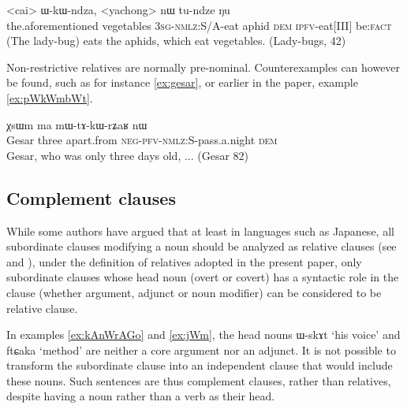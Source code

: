 \documentclass[oldfontcommands,oneside,a4paper,11pt]{article}
\newcommand{\ipa}[1]{{\phon #1}} %
\newcommand{\topic}{\textsc{dem}}
\begin{document}
\begin{exe}
   \ex  \label{ex:yachong}
\gll \ipa{iɕqʰa}  	<cai>  	\ipa{ɯ-kɯ-ndza},  	<yachong>  	\ipa{nɯ}  	\ipa{tu-ndze}  	\ipa{ŋu}  \\
the.aforementioned vegetables \textsc{3sg-nmlz:}S/A-eat aphid \topic{} \textsc{ipfv}-eat[III] be:\textsc{fact} \\
\glt (The lady-bug) eats the aphids, which eat vegetables. (Lady-bugs, 42)
\end{exe}



Non-restrictive relatives are normally pre-nominal. Counterexamples can however be found, such as  for instance \ref{ex:gesar}, or earlier in the paper, example \ref{ex:pWkWmbWt}.

\begin{exe}
   \ex  \label{ex:gesar}
\gll  \ipa{ʁlaŋsaŋtɕʰin}  	\ipa{χsɯm}  	\ipa{ma}  	\ipa{mɯ-tɤ-kɯ-rʑaʁ}  	\ipa{nɯ}     	\\
  Gesar three apart.from \textsc{neg-pfv-nmlz:S}-pass.a.night \topic{}   \\
 \glt  Gesar, who was only three days old, ... (Gesar 82)
   \end{exe} 



%




\subsection{Complement clauses} \label{sec:non.relative}
While some authors have argued that at least in languages such as Japanese, all subordinate clauses modifying a noun should be analyzed as relative clauses (see \citet{matsumoto88adnominal} and \citet{comrie98relatives.rethinking}), under the definition of relatives adopted in the present paper, only subordinate clauses whose head noun (overt or covert) has a syntactic role in the clause (whether argument, adjunct or noun modifier) can be considered to be relative clause.




In examples \ref{ex:kAnWrAGo} and \ref{ex:jWm}, the head nouns \ipa{ɯ-skɤt} `his voice' and  \ipa{ftɕaka} `method' are neither a core argument nor an adjunct. It is not possible to transform the subordinate clause into an independent clause that would include these nouns. Such sentences are thus complement clauses, rather than relatives, despite having a noun rather than a verb as their head.
\end{document}
